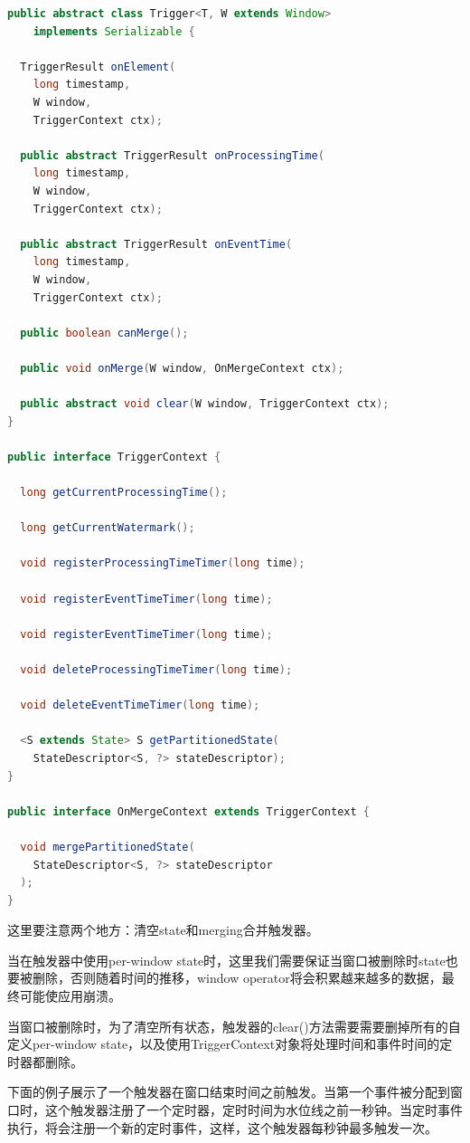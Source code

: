 \documentclass[oneside]{ctexbook}
\begin{document}
\begin{lstlisting}[language=java]
public abstract class Trigger<T, W extends Window>
    implements Serializable {

  TriggerResult onElement(
    long timestamp,
    W window,
    TriggerContext ctx);

  public abstract TriggerResult onProcessingTime(
    long timestamp,
    W window,
    TriggerContext ctx);

  public abstract TriggerResult onEventTime(
    long timestamp,
    W window,
    TriggerContext ctx);
  
  public boolean canMerge();

  public void onMerge(W window, OnMergeContext ctx);

  public abstract void clear(W window, TriggerContext ctx);
}

public interface TriggerContext {

  long getCurrentProcessingTime();

  long getCurrentWatermark();

  void registerProcessingTimeTimer(long time);

  void registerEventTimeTimer(long time);

  void registerEventTimeTimer(long time);

  void deleteProcessingTimeTimer(long time);

  void deleteEventTimeTimer(long time);

  <S extends State> S getPartitionedState(
    StateDescriptor<S, ?> stateDescriptor);
}

public interface OnMergeContext extends TriggerContext {

  void mergePartitionedState(
    StateDescriptor<S, ?> stateDescriptor
  );
}
\end{lstlisting}

这里要注意两个地方：清空state和merging合并触发器。

当在触发器中使用per-window state时，这里我们需要保证当窗口被删除时state也要被删除，否则随着时间的推移，window operator将会积累越来越多的数据，最终可能使应用崩溃。

当窗口被删除时，为了清空所有状态，触发器的clear()方法需要需要删掉所有的自定义per-window state，以及使用TriggerContext对象将处理时间和事件时间的定时器都删除。

下面的例子展示了一个触发器在窗口结束时间之前触发。当第一个事件被分配到窗口时，这个触发器注册了一个定时器，定时时间为水位线之前一秒钟。当定时事件执行，将会注册一个新的定时事件，这样，这个触发器每秒钟最多触发一次。
\end{document}
